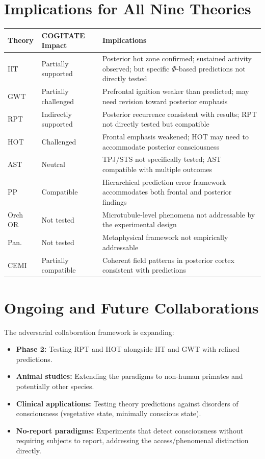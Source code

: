 \documentclass[11pt,a4paper]{report}
\begin{document}
\section{Implications for All Nine Theories}

\begin{center}
\renewcommand{\arraystretch}{1.35}
\small
\begin{tabular}{>{\raggedright}p{1.6cm} >{\raggedright}p{4cm} >{\raggedright\arraybackslash}p{7.5cm}}
  \toprule
  \textbf{Theory} & \textbf{COGITATE Impact} & \textbf{Implications} \\
  \midrule
  IIT & Partially supported & Posterior hot zone confirmed; sustained activity observed; but specific $\Phi$-based predictions not directly tested \\
  GWT & Partially challenged & Prefrontal ignition weaker than predicted; may need revision toward posterior emphasis \\
  RPT & Indirectly supported & Posterior recurrence consistent with results; RPT not directly tested but compatible \\
  HOT & Challenged & Frontal emphasis weakened; HOT may need to accommodate posterior consciousness \\
  AST & Neutral & TPJ/STS not specifically tested; AST compatible with multiple outcomes \\
  PP & Compatible & Hierarchical prediction error framework accommodates both frontal and posterior findings \\
  Orch OR & Not tested & Microtubule-level phenomena not addressable by the experimental design \\
  Pan. & Not tested & Metaphysical framework not empirically addressable \\
  CEMI & Partially compatible & Coherent field patterns in posterior cortex consistent with predictions \\
  \bottomrule
\end{tabular}
\end{center}

\section{Ongoing and Future Collaborations}

The adversarial collaboration framework is expanding:
\begin{itemize}[leftmargin=1.5em]
  \item \textbf{Phase 2:} Testing RPT and HOT alongside IIT and GWT with refined predictions.
  \item \textbf{Animal studies:} Extending the paradigms to non-human primates and potentially other species.
  \item \textbf{Clinical applications:} Testing theory predictions against disorders of consciousness (vegetative state, minimally conscious state).
  \item \textbf{No-report paradigms:} Experiments that detect consciousness without requiring subjects to report, addressing the access/phenomenal distinction directly.
\end{itemize}
\end{document}
